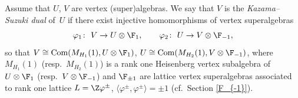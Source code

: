 Assume that $U$, $V$ are vertex (super)algebras. We say that $V$ is the \emph{Kazama--Suzuki dual} of~$U$ if there exist injective homomorphisms of vertex superalgebras
\begin{equation} \label{KSdef}
	\varphi_1 \colon\ V \rightarrow U \otimes \F_1, \qquad \varphi_2 \colon\ U \rightarrow V \otimes \F_{-1},
\end{equation}
so that
$V \cong \operatorname{Com} ( M_{H_1} (1) , U \otimes \F_1)$, $ U \cong \operatorname{Com} ( M_{H_2} (1) , V \otimes \F_{-1})$,
where $M_{H_1} (1) $ (resp.\ $ M_{H_2} (1)$) is a rank one Heisenberg vertex subalgebra of
$U\otimes \F_1$ (resp.\ $V\otimes \F_{-1}$) and $\F_{\pm 1}$ are lattice vertex superalgebras associated to rank one lattice $L= {\Z}\varphi^{\pm} $, $\big\langle \varphi^{\pm}, \varphi^{\pm} \big\rangle = \pm 1$ (cf.\ Section \ref{F_{-1}}).
